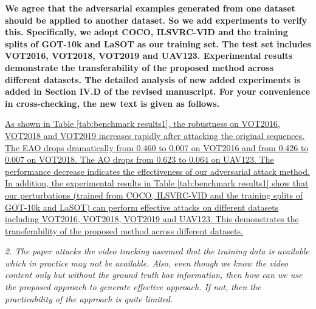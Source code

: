 \documentclass[12pt]{article}
\begin{document}
\textbf{
We agree that the adversarial examples generated from one dataset should be applied to another dataset. So we add experiments to verify this. Specifically, we adopt COCO, ILSVRC-VID and the training splits of GOT-10k and LaSOT as our training set. The test set includes VOT2016, VOT2018, VOT2019 and UAV123.
Experimental results demonstrate the transferability of the proposed method across different datasets.
The detailed analysis of new added experiments is added in Section IV.D of the revised manuscript. For your convenience in cross-checking, the new text is given as follows.}

\uline{As shown in Table \ref{tab:benchmark results1}, the robustness on VOT2016, VOT2018 and VOT2019 increases rapidly after attacking the original sequences. The EAO drops dramatically from 0.460 to 0.007 on VOT2016 and from 0.426 to 0.007 on VOT2018. The AO drops from 0.623 to 0.064 on UAV123. The performance decrease indicates the effectiveness of our adversarial attack method.
In addition, the experimental results in Table \ref{tab:benchmark results1} show that our perturbations (trained from COCO, ILSVRC-VID and the training splits of GOT-10k and LaSOT) can perform effective attacks on different datasets including VOT2016, VOT2018, VOT2019 and UAV123. This demonstrates the transferability of the proposed method across different datasets.
}

\textit{2. The paper attacks the video tracking assumed that the training data is available which in practice may not be available. Also, even though we know the video content only but without the ground truth box information, then how can we use the proposed approach to generate effective approach. If not, then the practicability of the approach is quite limited.}

\end{document}
